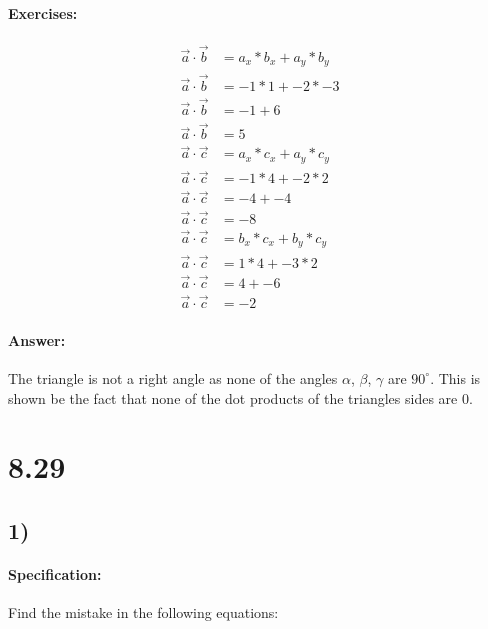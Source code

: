 \documentclass{article}
\begin{document}
\paragraph{Exercises:}
\begin{align}
    \vec{a} \cdot \vec{b} &= a_x * b_x + a_y * b_y \\
    \vec{a} \cdot \vec{b} &= -1 * 1 + -2 * -3 \\
    \vec{a} \cdot \vec{b} &= -1 + 6 \\
    \vec{a} \cdot \vec{b} &= 5 \\[20pt]
    \vec{a} \cdot \vec{c} &= a_x * c_x + a_y * c_y \\
    \vec{a} \cdot \vec{c} &= -1 * 4 + -2 * 2 \\
    \vec{a} \cdot \vec{c} &= -4 + -4 \\
    \vec{a} \cdot \vec{c} &= -8 \\[20pt]
    \vec{a} \cdot \vec{c} &= b_x * c_x + b_y * c_y \\
    \vec{a} \cdot \vec{c} &= 1 * 4 + -3 * 2 \\
    \vec{a} \cdot \vec{c} &= 4 + -6 \\
    \vec{a} \cdot \vec{c} &= -2
\end{align}

\paragraph{Answer:}
The triangle is not a right angle as none of the angles $\alpha$, $\beta$, $\gamma$ are $90^\circ$.
This is shown be the fact that none of the dot products of the triangles sides are 0.

\pagebreak

\section*{8.29}
\subsection*{1)}
\paragraph{Specification:}
Find the mistake in the following equations:
 \def\AB{\begin{pmatrix}
       15 \\
       8 \\
    \end{pmatrix}}
\end{document}
